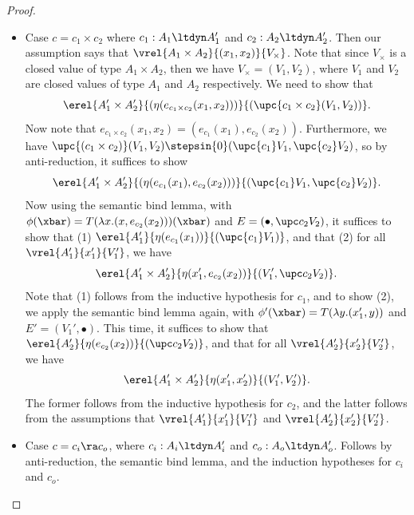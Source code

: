 \begin{proof}
\begin{itemize}
        \item Case $c = c_1 \times c_2$ where $c_1 : A_1 \ltdyn A_1'$ and $c_2 : A_2 \ltdyn A_2'$.
        Then our assumption says that $\vrel{A_1 \times A_2}{(x_1, x_2)}{V_\times}$.
        Note that since $V_\times$ is a closed value of type $A_1 \times A_2$,
        then we have $V_\times = (V_1, V_2)$, where $V_1$ and $V_2$ are closed
        values of type $A_1$ and $A_2$ respectively. We need to show that
        \[ \erel {A_1' \times A_2'} {(\eta(e_{c_1 \times c_2}(x_1, x_2)))} {(\upc {c_1 \times c_2} (V_1, V_2))}. \]
        Now note that $e_{c_1 \times c_2}(x_1, x_2) = (e_{c_1}(x_1), e_{c_2}(x_2))$.
        Furthermore, we have
        $\upc {(c_1 \times c_2)} (V_1, V_2) \stepsin{0} (\upc {c_1} V_1, \upc {c_2} V_2)$,
        so by anti-reduction, it suffices to show
        \[ \erel {A_1' \times A_2'} {(\eta(e_{c_1}(x_1), e_{c_2}(x_2)))} {(\upc {c_1} V_1, \upc {c_2} V_2)}. \]
        Now using the semantic bind lemma, with $\phi(\xbar) = T(\lambda x. (x, e_{c_2}(x_2)))(\xbar)$ and 
        $E = (\bullet, \upc c_2 V_2)$, it suffices to show that (1)
        $\erel{A_1'}{\eta(e_{c_1}(x_1))}{(\upc {c_1} V_1)}$,
        and that (2) for all $\vrel{A_1'}{x_1'}{V_1'}$, we have 
        \[ \erel{A_1' \times A_2'}{\eta(x_1', e_{c_2}(x_2))}{(V_1', \upc c_2 V_2)}. \]
        Note that (1) follows from the inductive hypothesis for $c_1$, and to show (2), we apply the
        semantic bind lemma again, with $\phi'(\xbar) = T(\lambda y. (x_1', y))$ and $E' = (V_1', \bullet)$.
        This time, it suffices to show that $\erel{A_2'}{\eta(e_{c_2}(x_2))}{(\upc c_2 V_2)}$,
        and that for all $\vrel{A_2'}{x_2'}{V_2'}$, we have
        \[ \erel{A_1' \times A_2'}{\eta(x_1', x_2')}{(V_1', V_2')}. \]
        The former follows from the inductive hypothesis for $c_2$, and the latter follows
        from the assumptions that $\vrel{A_1'}{x_1'}{V_1'}$ and $\vrel{A_2'}{x_2'}{V_2'}$. 

        \item Case $c = c_i \ra c_o$, where $c_i : A_i \ltdyn A_i'$ and $c_o :
        A_o \ltdyn A_o'$. Follows by anti-reduction, the semantic bind lemma,
        and the induction hypotheses for $c_i$ and $c_o$.
        


\end{itemize}
\end{proof}
